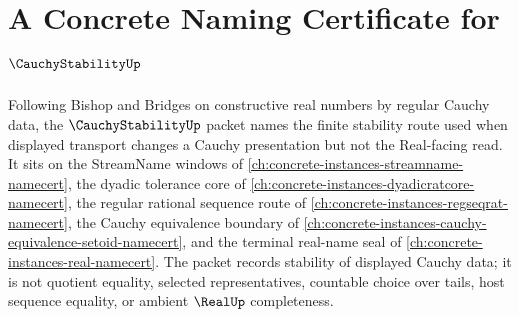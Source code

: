 \chapter{A Concrete Naming Certificate for $\CauchyStabilityUp$}
\label{ch:concrete-instances-cauchy-stability-namecert}

Following Bishop and Bridges on constructive real numbers by regular Cauchy data, the $\CauchyStabilityUp$ packet names the finite stability route used when displayed transport changes a Cauchy presentation but not the Real-facing read. It sits on the StreamName windows of \autoref{ch:concrete-instances-streamname-namecert}, the dyadic tolerance core of \autoref{ch:concrete-instances-dyadicratcore-namecert}, the regular rational sequence route of \autoref{ch:concrete-instances-regseqrat-namecert}, the Cauchy equivalence boundary of \autoref{ch:concrete-instances-cauchy-equivalence-setoid-namecert}, and the terminal real-name seal of \autoref{ch:concrete-instances-real-namecert}. The packet records stability of displayed Cauchy data; it is not quotient equality, selected representatives, countable choice over tails, host sequence equality, or ambient $\RealUp$ completeness.

